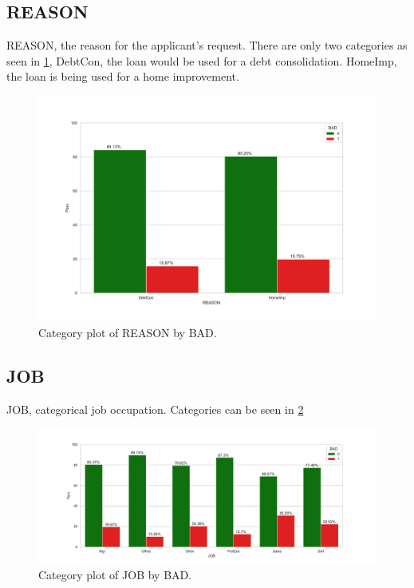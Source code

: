 \subsection*{REASON}

REASON, the reason for the applicant's request. There are only two categories as seen in \ref{reason_cat}, DebtCon, the loan would be used for a debt consolidation. HomeImp, the loan is being used for a home improvement. 

\begin{figure}[!ht]
	\centering
	\includegraphics[scale=0.40]{figs/reason_cat.pdf}
	\caption{Category plot of REASON by BAD. \label{reason_cat}}
\end{figure}

\subsection*{JOB}

JOB, categorical job occupation. Categories can be seen in \ref{job_cat} 

\begin{figure}[!ht]
	\centering
	\includegraphics[scale=0.40]{figs/job_cat.pdf}
	\caption{Category plot of JOB by BAD. \label{job_cat}}
\end{figure}

